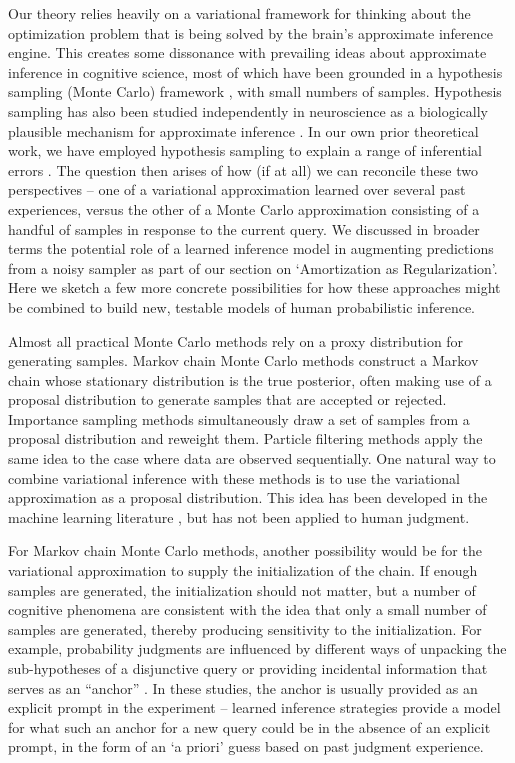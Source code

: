 Our theory relies heavily on a variational framework for thinking about the optimization problem that is being solved by the brain's approximate inference engine. This creates some dissonance with prevailing ideas about approximate inference in cognitive science, most of which have been grounded in a hypothesis sampling (Monte Carlo) framework \citep[see][for a review]{sanborn2016bayesian}, with small numbers of samples. Hypothesis sampling has also been studied independently in neuroscience as a biologically plausible mechanism for approximate inference \citep[e.g.,][]{buesing2011neural,haefner2016perceptual}. In our own prior theoretical work, we have employed hypothesis sampling to explain a range of inferential errors \citep{dasgupta2017hypotheses,dasgupta2018remembrance}. The question then arises of how (if at all) we can reconcile these two perspectives -- one of a variational approximation learned over several past experiences, versus the other of a Monte Carlo approximation consisting of a handful of samples in response to the current query. We discussed in broader terms the potential role of a learned inference model in augmenting predictions from a noisy sampler as part of our section on `Amortization as Regularization'. Here we sketch a few more concrete possibilities for how these approaches might be combined to build new, testable models of human probabilistic inference.

Almost all practical Monte Carlo methods rely on a proxy distribution for generating samples. Markov chain Monte Carlo methods construct a Markov chain whose stationary distribution is the true posterior, often making use of a proposal distribution to generate samples that are accepted or rejected. Importance sampling methods simultaneously draw a set of samples from a proposal distribution and reweight them. Particle filtering methods apply the same idea to the case where data are observed sequentially. One natural way to combine variational inference with these methods is to use the variational approximation as a proposal distribution. This idea has been developed in the machine learning literature \citep[e.g.,][]{de2001variational,gu2015neural}, but has not been applied to human judgment.

For Markov chain Monte Carlo methods, another possibility would be for the variational approximation to supply the initialization of the chain. If enough samples are generated, the initialization should not matter, but a number of cognitive phenomena are consistent with the idea that only a small number of samples are generated, thereby producing sensitivity to the initialization. For example, probability judgments are influenced by different ways of unpacking the sub-hypotheses of a disjunctive query \citep{dasgupta2017hypotheses} or providing incidental information that serves as an ``anchor'' \citep{lieder2017anchoring,lieder2018empirical}. In these studies, the anchor is usually provided as an explicit prompt in the experiment -- learned inference strategies provide a model for what such an anchor for a new query could be in the absence of an explicit prompt, in the form of an `a priori' guess based on past judgment experience.

